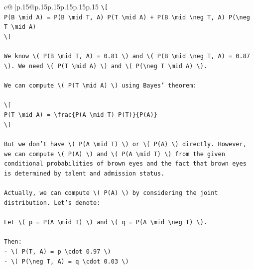 \documentclass{article}
\begin{document}
{\begin{supertabular}{c@{$\;$}|p{.15\linewidth}@{}p{.15\linewidth}p{.15\linewidth}p{.15\linewidth}p{.15\linewidth}p{.15\linewidth}}
{{{\texttt{\textbackslash{}{[}} \\
\texttt{P(B \textbackslash{}mid A) = P(B \textbackslash{}mid T, A) P(T \textbackslash{}mid A) + P(B \textbackslash{}mid \textbackslash{}neg T, A) P(\textbackslash{}neg T \textbackslash{}mid A)} \\
\texttt{\textbackslash{}{]}} \\
\\ 
\texttt{We know \textbackslash{}( P(B \textbackslash{}mid T, A) = 0.81 \textbackslash{}) and \textbackslash{}( P(B \textbackslash{}mid \textbackslash{}neg T, A) = 0.87 \textbackslash{}). We need \textbackslash{}( P(T \textbackslash{}mid A) \textbackslash{}) and \textbackslash{}( P(\textbackslash{}neg T \textbackslash{}mid A) \textbackslash{}).} \\
\\ 
\texttt{We can compute \textbackslash{}( P(T \textbackslash{}mid A) \textbackslash{}) using Bayes’ theorem:} \\
\\ 
\texttt{\textbackslash{}{[}} \\
\texttt{P(T \textbackslash{}mid A) = \textbackslash{}frac\{P(A \textbackslash{}mid T) P(T)\}\{P(A)\}} \\
\texttt{\textbackslash{}{]}} \\
\\ 
\texttt{But we don’t have \textbackslash{}( P(A \textbackslash{}mid T) \textbackslash{}) or \textbackslash{}( P(A) \textbackslash{}) directly. However, we can compute \textbackslash{}( P(A) \textbackslash{}) and \textbackslash{}( P(A \textbackslash{}mid T) \textbackslash{}) from the given conditional probabilities of brown eyes and the fact that brown eyes is determined by talent and admission status.} \\
\\ 
\texttt{Actually, we can compute \textbackslash{}( P(A) \textbackslash{}) by considering the joint distribution. Let’s denote:} \\
\\ 
\texttt{Let \textbackslash{}( p = P(A \textbackslash{}mid T) \textbackslash{}) and \textbackslash{}( q = P(A \textbackslash{}mid \textbackslash{}neg T) \textbackslash{}).} \\
\\ 
\texttt{Then:} \\
\texttt{{-} \textbackslash{}( P(T, A) = p \textbackslash{}cdot 0.97 \textbackslash{})} \\
\texttt{{-} \textbackslash{}( P(\textbackslash{}neg T, A) = q \textbackslash{}cdot 0.03 \textbackslash{})} \\
}}}
\end{supertabular}}
\end{document}
